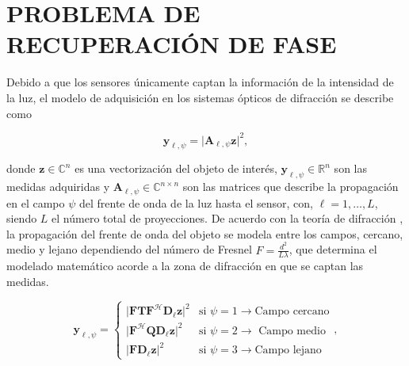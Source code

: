\section{PROBLEMA DE RECUPERACIÓN DE FASE}

Debido a que los sensores únicamente captan la información de la intensidad de la luz, el modelo de adquisición en los sistemas ópticos de difracción se describe como

\begin{equation}
    \mathbf{y}_{\ell, \psi} = \vert \mathbf{A}_{\ell, \psi}\mathbf{z} \vert^2, 
    \label{eq:phase_retrieval_problem}
\end{equation}

donde $\mathbf{z} \in {\mathbb{C}}^{n}$ es una vectorización del objeto de interés, $\mathbf{y}_{\ell, \psi} \in \mathbb{R}^{n}$ son las medidas adquiridas y $\mathbf{A}_{\ell, \psi}\in\mathbb{C}^{n\times n}$ son las matrices que describe la propagación en el campo $\psi$ del frente de onda de la luz hasta el sensor, con,  $\ell=1,\dots,L$, siendo $L$ el número total de proyecciones. De acuerdo con la teoría de difracción , la propagación del frente de onda del objeto se modela entre los campos, cercano, medio y lejano dependiendo del número de Fresnel $F = \frac{d^2}{L\lambda}$, que determina el modelado matemático acorde a la zona de difracción en que se captan las medidas.


\begin{equation}
    \mathbf{y}_{\ell,\psi}= \left\{\begin{matrix}
\vert \mathbf{F}\mathbf{T}\mathbf{F}^\mathcal{H} \mathbf{D}_\ell \mathbf{z} \vert^2 & \text{si } \psi=1\rightarrow \text{Campo cercano}\\ 
\vert \mathbf{F}^\mathcal{H}\mathbf{Q}\mathbf{D}_\ell \mathbf{z} \vert^2&\text{si } \psi=2\rightarrow\text{ Campo medio} \\ 
\vert \mathbf{F}\mathbf{D}_\ell \mathbf{z} \vert^2 &\text{si } \psi=3\rightarrow\text{Campo lejano}
\end{matrix}\right., \label{eq:matrix_a}
\end{equation}

